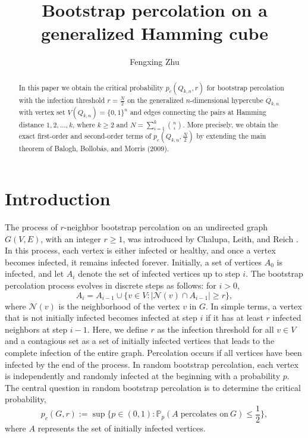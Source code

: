 \documentclass[reqno,11pt]{amsart}
\title[]{Bootstrap percolation on a generalized Hamming cube \MakeUppercase{\romannumeral 2}}
\author[]{Fengxing Zhu}\thanks{Institute for Systems Research and Department of ECE, University of Maryland, College Park, MD 20742, USA, fengxing@terpmail.umd.edu. Supported in part by NSF grant CCF 2330909.}
\date{}
\renewcommand{\leq}{\leqslant}
\renewcommand{\ge}{\geqslant}
\renewcommand{\geq}{\geqslant}
\begin{document}
\begin{abstract}
    In this paper we obtain the critical probability  $p_c(Q_{k,n},r)$ for bootstrap percolation with the infection threshold $r=\frac{N}{2}$ on the generalized $n$-dimensional hypercube $Q_{k,n}$ with vertex set $V(Q_{k,n})=\{0,1\}^n$ and edges connecting the pairs at Hamming distance $1,2,\dots,k$, where $k\ge 2$ and $N=\sum_{i=1}^k\binom{n}{i}$. More precisely, we obtain the exact first-order and second-order terms of $p_c(Q_{k,n},\frac{N}{2})$ by extending the main theorem of Balogh, Bollob{\'a}s, and Morris (2009). 
\end{abstract}
\maketitle

\section{Introduction}
The process of $r$-neighbor bootstrap percolation on an undirected graph $G(V,E)$, with an integer $r\geq 1$, was introduced by Chalupa, Leith, and Reich \cite{Chalupa_1979}. In this process, each vertex is either infected or healthy, and once a vertex becomes infected, it remains infected forever. Initially, a set of vertices $A_0$ is infected, and let $A_i$ denote the set of infected vertices up to step $i$. The bootstrap percolation process evolves in discrete steps as follows: for $i>0$,
$$A_i = A_{i-1} \cup \{v \in V:|\mathcal{N}(v) \cap A_{i-1}| \geq r \},$$
where $\mathcal{N}(v)$ is the neighborhood of the vertex $v$ in $G$. In simple terms, a vertex that is not initially infected becomes infected at step $i$ if it has at least $r$ infected neighbors at step $i-1$. Here, we define $r$ as the infection threshold for all $v \in V$ and a contagious set as a set of initially infected vertices that leads to the complete infection of the entire graph. Percolation occurs if all vertices have been infected by the end of the process. In random bootstrap percolation, each vertex is independently and randomly infected at the beginning with a probability $p$. The central question in random bootstrap percolation is to determine the critical probability,
$$p_c(G,r):=\sup\{p \in (0,1): \mathbb{P}_p(A \; \text{percolates on} \: G) \leq \frac{1}{2} \},$$
where $A$ represents the set of initially infected vertices.
\end{document}
